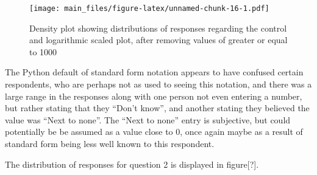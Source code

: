 \documentclass[
]{article}
\newenvironment{Shaded}{\begin{snugshade}}{\end{snugshade}}
\newcommand{\DecValTok}[1]{\textcolor[rgb]{0.00,0.00,0.81}{#1}}
\newcommand{\KeywordTok}[1]{\textcolor[rgb]{0.13,0.29,0.53}{\textbf{#1}}}
\newcommand{\NormalTok}[1]{#1}
\newcommand{\OperatorTok}[1]{\textcolor[rgb]{0.81,0.36,0.00}{\textbf{#1}}}
\newcommand{\StringTok}[1]{\textcolor[rgb]{0.31,0.60,0.02}{#1}}
\begin{document}
\begin{figure}
\centering
\texttt{[image: main\_files/figure-latex/unnamed-chunk-16-1.pdf]}
\caption{Density plot showing distributions of responses regarding the
control and logarithmic scaled plot, after removing values of greater or
equal to 1000}
\end{figure}

The Python default of standard form notation appears to have confused
certain respondents, who are perhaps not as used to seeing this
notation, and there was a large range in the responses along with one
person not even entering a number, but rather stating that they ``Don't
know'', and another stating they believed the value was ``Next to
none''. The ``Next to none'' entry is subjective, but could potentially
be be assumed as a value close to 0, once again maybe as a result of
standard form being less well known to this respondent.

The distribution of responses for question 2 is displayed in
figure{[}?{]}.

\begin{Shaded}
\end{Shaded}
\end{document}
